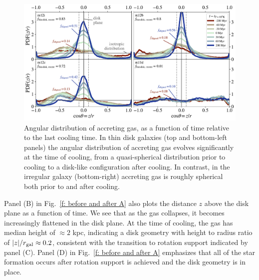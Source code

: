 \documentclass[fleqn,usenatbib]{mnras}
\begin{document}
\begin{figure}
    \centering
    \includegraphics[width=\textwidth]{figures/theta_vs_t.pdf}
    \caption{
    Angular distribution of accreting gas, as a function of time relative to the last cooling time.
    In thin disk galaxies (top and bottom-left panels) the angular distribution of accreting gas evolves significantly at the time of cooling, from a quasi-spherical distribution prior to cooling to a disk-like configuration after cooling. 
    In contrast, in the irregular galaxy (bottom-right) accreting gas is roughly spherical both prior to and after cooling.
    }
    \label{f: theta vs t}
\end{figure}

Panel (B) in Fig.~\ref{f: before and after A} also plots the distance $z$ above the disk plane as a function of time.
We see that as the gas collapses, it becomes increasingly flattened in the disk plane.
At the time of cooling, the gas has median height of $\approx 2$ kpc, indicating a disk geometry with height to radius ratio of $\vert z\vert/r_{\rm gal}\approx0.2$, consistent with the transition to rotation support indicated by panel (C).
Panel (D) in Fig.~\ref{f: before and after A} emphasizes that all of the star formation occurs after rotation support is achieved and the disk geometry is in place.
\end{document}
